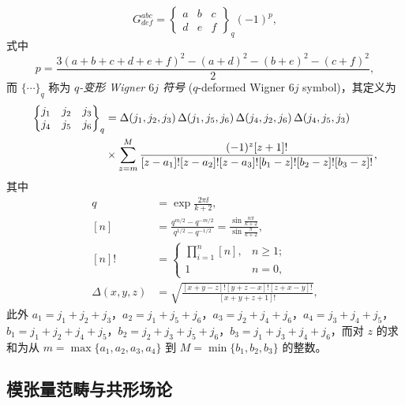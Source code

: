 \begin{equation}
  G^{abc}_{def} = \begin{Bmatrix} a & b & c \\ d & e & f \end{Bmatrix}_q (-1)^p,
\end{equation}
式中
\begin{equation}
  p = \frac{3(a+b+c+d+e+f)^2 - (a+d)^2 - (b+e)^2 - (c+f)^2}{2},
\end{equation}
而 $\{\cdots\}_q$ 称为 \emph{$q$-变形 Wigner $6j$ 符号} ($q$-deformed Wigner $6j$ symbol)，其定义为
\begin{align}
  \begin{Bmatrix} j_1 & j_2 & j_3 \\ j_4 & j_5 & j_6 \end{Bmatrix}_q
  &= \Delta(j_1,j_2,j_3) \, \Delta(j_1,j_5,j_6) \, \Delta(j_4,j_2,j_6) \, \Delta(j_4,j_5,j_3) \notag \\
  &\times \sum_{z=m}^M \frac{(-1)^z [z+1]!}{[z-a_1]![z-a_2]![z-a_3]! [b_1-z]![b_2-z]![b_3-z]!},
\end{align}
其中
\begin{align}
  q    &= \exp\frac{2\pi\ii}{k+2}, \\
  [n]  &= \frac{q^{m/2} - q^{-m/2}}{q^{1/2} - q^{-1/2}} = \frac{\sin\frac{n\pi}{k+2}}{\sin\frac{\pi}{k+2}}, \\
  [n]! &= \begin{cases}
    \prod_{i=1}^{n} [n], & n \geqslant 1; \\
    1                    & n = 0,
  \end{cases} \\
  \Delta(x,y,z) &= \sqrt{\frac{[x+y-z]! [y+z-x]! [z+x-y]!}{[x+y+z+1]!}},
\end{align}
此外 $a_1=j_1+j_2+j_3$，$a_2=j_1+j_5+j_6$，$a_3=j_2+j_4+j_6$，$a_4=j_3+j_4+j_5$，$b_1=j_1+j_2+j_4+j_5$，$b_2=j_2+j_3+j_5+j_6$，$b_3=j_1+j_3+j_4+j_6$，而对 $z$ 的求和为从 $m=\max\{a_1,a_2,a_3,a_4\}$ 到 $M=\min\{b_1,b_2,b_3\}$ 的整数。

\subsection{模张量范畴与共形场论}

